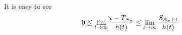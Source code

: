 \documentclass[twocolumn]{autart}    %
\begin{document}
\begin{pf}
    
    It is easy to see
\begin{equation}
    \begin{aligned}
        \setlength{\arraycolsep}{0.9pt}
        0\le\lim_{t \rightarrow\infty}\frac{t-T_{N_{\sigma}}}{h(t)} \le \lim_{t \rightarrow\infty}\frac{S_{N_{\sigma}+1}}{h(t)}
    \end{aligned}
\end{equation}


\end{pf}
\end{document}
